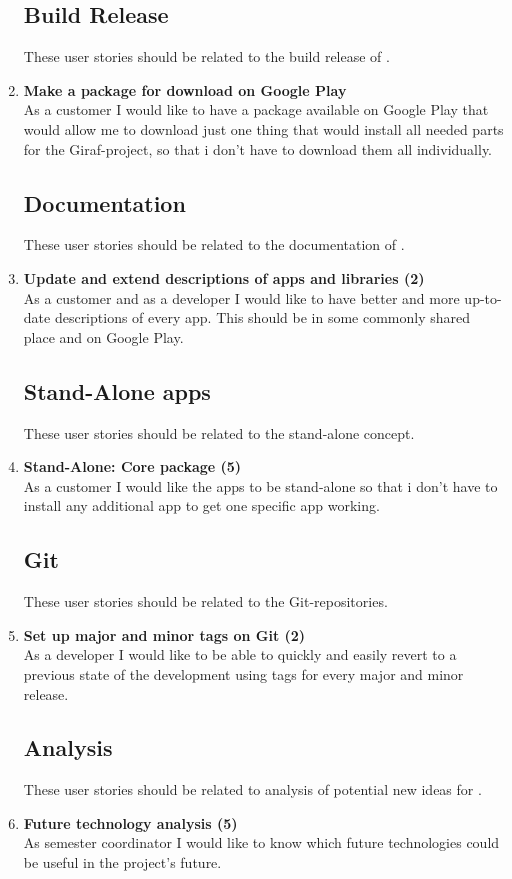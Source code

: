 \begin{enumerate}
\subsection{Build Release}
These user stories should be related to the build release of \giraf.

\item \textbf{Make a package for download on Google Play}\\
As a customer I would like to have a package available on Google Play that would allow me to download just one thing that would install all needed parts for the Giraf-project, so that i don’t have to download them all individually.

\subsection{Documentation}
These user stories should be related to the documentation of \giraf.

\item \textbf{Update and extend descriptions of apps and libraries (2)}\\
As a customer and as a developer I would like to have better and more up-to-date descriptions of every app. This should be in some commonly shared place and on Google Play.

\subsection{Stand-Alone apps}
These user stories should be related to the stand-alone concept.

\item \textbf{Stand-Alone: Core package (5)}\\
As a customer I would like the apps to be stand-alone so that i don't have to install any additional app to get one specific app working.

\subsection{Git}
These user stories should be related to the Git-repositories.

\item \textbf{Set up major and minor tags on Git (2)}\\
As a developer I would like to be able to quickly and easily revert to a previous state of the development using tags for every major and minor release.

\subsection{Analysis}
These user stories should be related to analysis of potential new ideas for \giraf.

\item \textbf{Future technology analysis (5)}\\
As semester coordinator I would like to know which future technologies could be useful in the project’s future.

\end{enumerate}

